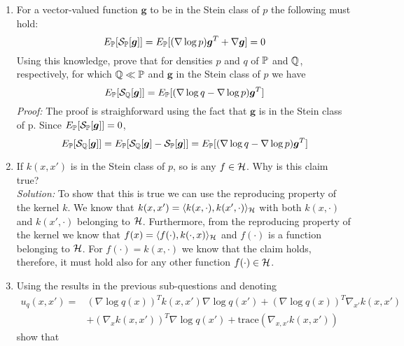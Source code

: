 \begin{enumerate}
	\item For a vector-valued function $\boldsymbol{g}$ to be in the Stein class of $p$ the following must hold:
	\begin{equation*}
	E_{\mathbb{P}}[\mathcal{S}_{\mathbb{P}}[\boldsymbol{g}]] = E_{\mathbb{P}}[(\nabla \log p)\boldsymbol{g}^T + \nabla \boldsymbol{g}] = 0
	\end{equation*}
	Using this knowledge, prove that for densities $p$ and $q$ of $\mathbb{P}$ and $\mathbb{Q}$, respectively, for which $\mathbb{Q} \ll \mathbb{P}$ and $\boldsymbol{g}$ in the Stein class of $p$ we have
	\begin{equation*}
	E_{\mathbb{P}}[\mathcal{S}_{\mathbb{Q}}[\boldsymbol{g}]] = E_{\mathbb{P}}[(\nabla \log q - \nabla \log p)\boldsymbol{g}^T] 
	\end{equation*}
	\emph{Proof:} The proof is straighforward using the fact that $\boldsymbol{g}$ is in the Stein class of p. Since $E_{\mathbb{P}}[\mathcal{S}_{\mathbb{P}}[\boldsymbol{g}]] = 0$, 
	\begin{equation*}
	E_{\mathbb{P}}[\mathcal{S}_{\mathbb{Q}}[\boldsymbol{g}]] = E_{\mathbb{P}}[\mathcal{S}_{\mathbb{Q}}[\boldsymbol{g}] - \mathcal{S}_{\mathbb{P}}[\boldsymbol{g}]] = E_{\mathbb{P}}[(\nabla \log q - \nabla \log p)\boldsymbol{g}^T] 
	\end{equation*}
	\item If $k(x, x')$ is in the Stein class of $p$, so is any $f \in \mathcal{H}$. Why is this claim true?
	\\
	\emph{Solution:} To show that this is true we can use the reproducing property of the kernel $k$. We know that $k(x, x') = \langle k(x, \cdot), k(x', \cdot)\rangle_{\mathcal{H}}$ with both $k(x, \cdot)$ and $k(x', \cdot)$ belonging to $\mathcal{H}$. Furthermore, from the reproducing property of the kernel we know that $f(x) = \langle f(\cdot), k(\cdot, x)\rangle_{\mathcal{H}}$ and $f(\cdot)$ is a function belonging to $\mathcal{H}$. For $f(\cdot) = k(x, \cdot)$ we know that the claim holds, therefore, it must hold also for any other function $f(\cdot) \in \mathcal{H}$. 
	\item Using the results in the previous sub-questions and denoting 
	\begin{equation*}
	\begin{split}
	u_q(x, x') = &(\nabla \log q(x))^Tk(x, x')\nabla \log q(x') + (\nabla \log q(x))^T \nabla_{x'}k(x, x')\\ &+ (\nabla_x k(x, x'))^T\nabla \log q(x') + \text{trace}(\nabla_{x, x'}k(x, x'))
	\end{split}
	\end{equation*}
	show that 
	\begin{equation*}

\end{equation*}
\end{enumerate}
